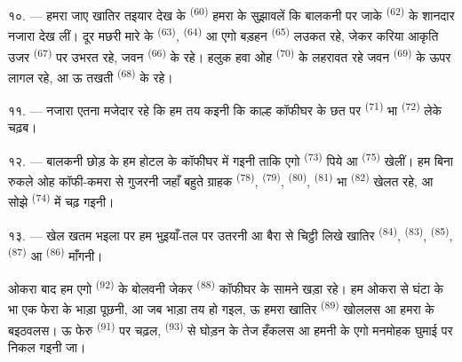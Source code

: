 १०. --- हमरा जाए खातिर तइयार देख के  \textsuperscript{(60)}
हमरा के सुझावलें कि बालकनी पर जाके  \textsuperscript{(62)}
के शानदार नजारा देख लीं। दूर मछरी मारे के 
\textsuperscript{(63)},  \textsuperscript{(64)} आ एगो
बड़हन  \textsuperscript{(65)} लउकत रहे, जेकर करिया
आकृति उजर  \textsuperscript{(67)} पर उभरत रहे, जवन
 \textsuperscript{(66)} के रहे। हलुक हवा ओह 
\textsuperscript{(70)} के लहरावत रहे जवन 
\textsuperscript{(69)} के ऊपर लागल रहे, आ ऊ तखती 
\textsuperscript{(68)} के रहे।

\VUsaut{3.0mm}
\VUsaut{3.0mm}

११. --- नजारा एतना मजेदार रहे कि हम तय कइनी कि काल्ह कॉफीघर के छत पर
 \textsuperscript{(71)} भा 
\textsuperscript{(72)} लेके चढ़ब।

१२. --- बालकनी छोड़ के हम होटल के कॉफीघर में गइनी ताकि एगो
 \textsuperscript{(73)} पिये आ 
\textsuperscript{(75)} खेलीं। हम बिना रुकले ओह कॉफी-कमरा से गुजरनी जहाँ
बहुते ग्राहक  \textsuperscript{(78)}, 
\textsuperscript{(79)},  \textsuperscript{(80)},
 \textsuperscript{(81)} भा  \textsuperscript{(82)}
खेलत रहे, आ सोझे  \textsuperscript{(74)} में चढ़
गइनी।

१३. --- खेल खतम भइला पर हम भुइयाँ-तल पर उतरनी आ बैरा से चिट्ठी लिखे
खातिर  \textsuperscript{(84)}, 
\textsuperscript{(83)},  \textsuperscript{(85)}, 
\textsuperscript{(87)} आ  \textsuperscript{(86)} माँगनी।

ओकरा बाद हम एगो  \textsuperscript{(92)} के बोलवनी जेकर
 \textsuperscript{(88)} कॉफीघर के सामने खड़ा रहे। हम ओकरा से
घंटा के भा एक फेरा के भाड़ा पूछनी, आ जब भाड़ा तय हो गइल, ऊ हमरा खातिर
 \textsuperscript{(89)} खोललस आ हमरा के बइठवलस। ऊ
फेरु  \textsuperscript{(91)} पर चढ़ल, 
\textsuperscript{(93)} से घोड़न के तेज हँकलस आ हमनी के एगो मनमोहक घुमाई
पर निकल गइनी जा।

